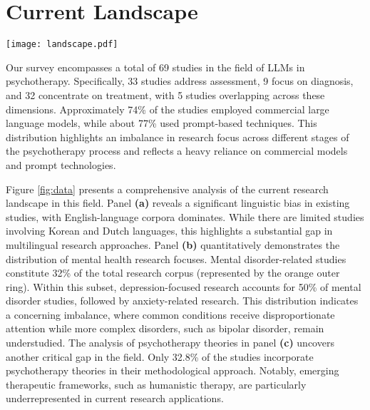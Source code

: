 \section{Current Landscape}
\label{sec:landscape}


\begin{figure*}[htb]
\centering
\texttt{[image: landscape.pdf]}
    \caption{Distribution analysis of the current landscape.}
    \vspace{-3mm}
    \label{fig:data}
\end{figure*}
Our survey encompasses a total of 69 studies in the field of LLMs in psychotherapy. Specifically, 33 studies address assessment, 9 focus on diagnosis, and 32 concentrate on treatment, with 5 studies overlapping across these dimensions. Approximately 74\% of the studies employed commercial large language models, while about 77\% used prompt-based techniques. This distribution highlights an imbalance in research focus across different stages of the psychotherapy process and reflects a heavy reliance on commercial models and prompt technologies.

Figure \ref{fig:data} presents a comprehensive analysis of the current research landscape in this field. 
Panel \textbf{(a)} reveals a significant linguistic bias in existing studies, with English-language corpora dominates. 
While there are limited studies involving Korean and Dutch languages, this highlights a substantial gap in multilingual research approaches.
Panel \textbf{(b)} quantitatively demonstrates the distribution of mental health research focuses. Mental disorder-related studies constitute 32\% of the total research corpus (represented by the orange outer ring).
Within this subset, depression-focused research accounts for 50\% of mental disorder studies, followed by anxiety-related research. This distribution indicates a concerning imbalance, where common conditions receive disproportionate attention while more complex disorders, such as bipolar disorder, remain understudied.
The analysis of psychotherapy theories in panel \textbf{(c)} uncovers another critical gap in the field. Only 32.8\% of the studies incorporate psychotherapy theories in their methodological approach. 
Notably, emerging therapeutic frameworks, such as humanistic therapy, are particularly underrepresented in current research applications.


